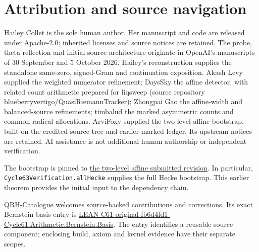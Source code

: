 \hypertarget{attribution:attribution-and-source-navigation}{%
\section{Attribution and source navigation}\label{attribution:attribution-and-source-navigation}}

Hailey Collet is the sole human author. Her manuscript and code are released under Apache-2.0; inherited licenses and source notices are retained. The probe, theta reflection and initial source architecture originate in OpenAI's manuscripts of 30 September and 5 October 2026. Hailey's reconstruction supplies the standalone same-zero, signed-Gram and continuation exposition. Akash Levy supplied the weighted numerator refinement; DaysSky the affine detector, with related count arithmetic prepared for liqsweep (source repository blueberryvertigo/QuasiRiemannTracker); Zhongpai Gao the affine-width and balanced-source refinements; timbalud the marked asymmetric counts and common-radical allocations. ArviFoxy supplied the two-level affine bootstrap, built on the credited source tree and earlier marked ledger. Its upstream notices are retained. AI assistance is not additional human authorship or independent verification.

The bootstrap is pinned to \href{https://github.com/GTimG/QuasiRiemannTracker/tree/0db497edc397d7076b1652b060e49c76b683e901/submissions/two-level-affine-20261019}{the two-level affine submitted revision}. In particular, \texttt{Cycle63\allowbreak{}Verification.\allowbreak{}all\allowbreak{}Hecke} supplies the full Hecke bootstrap. This earlier theorem provides the initial input to the dependency chain.

\href{https://github.com/HaileyStorm/QRH-Catalogue}{QRH-Catalogue} welcomes source-backed contributions and corrections. Its exact Bernstein-basis entry is \href{https://github.com/HaileyStorm/QRH-Catalogue/blob/094abdb67d645d60474efb19a26dfaf7b250962c/generated/records/0092.md\#lean-c61-original-fb6d4fd1-cycle61-arithmetic-bernstein-basis-287a58e1f6}{LEAN-C61-original-fb6d4fd1-Cycle61.Arithmetic.Bernstein.Basis}. The entry identifies a reusable source component; enclosing build, axiom and kernel evidence have their separate scopes.
